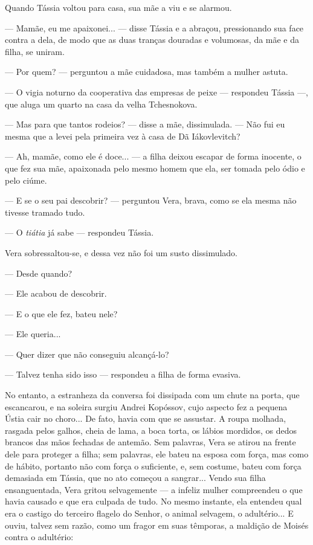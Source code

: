 Quando Tássia voltou para casa, sua mãe a viu e se alarmou.

--- Mamãe, eu me apaixonei... --- disse Tássia e a abraçou, pressionando
sua face contra a dela, de modo que as duas tranças douradas e
volumosas, da mãe e da filha, se uniram.

--- Por quem? --- perguntou a mãe cuidadosa, mas também a mulher astuta.

--- O vigia noturno da cooperativa das empresas de peixe --- respondeu
Tássia ---, que aluga um quarto na casa da velha Tchesnokova.

--- Mas para que tantos rodeios? --- disse a mãe, dissimulada. --- Não
fui eu mesma que a levei pela primeira vez à casa de Dã Iákovlevitch?

--- Ah, mamãe, como ele é doce... --- a filha deixou escapar de forma
inocente, o que fez sua mãe, apaixonada pelo mesmo homem que ela, ser
tomada pelo ódio e pelo ciúme.

--- E se o seu pai descobrir? --- perguntou Vera, brava, como se ela
mesma não tivesse tramado tudo.

--- O \emph{tiátia} já sabe --- respondeu Tássia.

Vera sobressaltou-se, e dessa vez não foi um susto dissimulado.

--- Desde quando?

--- Ele acabou de descobrir.

--- E o que ele fez, bateu nele?

--- Ele queria...

--- Quer dizer que não conseguiu alcançá-lo?

--- Talvez tenha sido isso --- respondeu a filha de forma evasiva.

No entanto, a estranheza da conversa foi dissipada com um chute na
porta, que escancarou, e na soleira surgiu Andrei Kopóssov, cujo aspecto
fez a pequena Ústia cair no choro... De fato, havia com que se assustar.
A roupa molhada, rasgada pelos galhos, cheia de lama, a boca torta, os
lábios mordidos, os dedos brancos das mãos fechadas de antemão. Sem
palavras, Vera se atirou na frente dele para proteger a filha; sem
palavras, ele bateu na esposa com força, mas como de hábito, portanto
não com força o suficiente, e, sem costume, bateu com força demasiada em
Tássia, que no ato começou a sangrar... Vendo sua filha ensanguentada,
Vera gritou selvagemente --- a infeliz mulher compreendeu o que havia
causado e que era culpada de tudo. No mesmo instante, ela entendeu qual
era o castigo do terceiro flagelo do Senhor, o animal selvagem, o
adultério... E ouviu, talvez sem razão, como um fragor em suas têmporas,
a maldição de Moisés contra o adultério:

